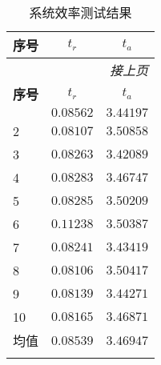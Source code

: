 
\begin{center}
  \setlength{\tabcolsep}{25pt}
  \begin{longtable}{ l c c }
    \hline
    \textbf{序号} & \textbf{$t_r$} & \textbf{$t_a$} \\ \hline \hline
    \endfirsthead
    \multicolumn{3}{r}{\textit{接上页}} \\
    \hline
    \textbf{序号} & \textbf{$t_r$} & \textbf{$t_a$} \\ \hline \hline
    \endhead
    \hline
    \endfoot
    \endlastfoot
    1 & $0.08562$ & $3.44197$ \\
    2 & $0.08107$ & $3.50858$ \\
    3 & $0.08263$ & $3.42089$ \\
    4 & $0.08283$ & $3.46747$ \\
    5 & $0.08285$ & $3.50209$ \\
    6 & $0.11238$ & $3.50387$ \\
    7 & $0.08241$ & $3.43419$ \\
    8 & $0.08106$ & $3.50417$ \\
    9 & $0.08139$ & $3.44271$ \\
    10 & $0.08165$ & $3.46871$ \\
    均值 & $0.08539$ & $3.46947$ \\
    \hline
  \caption{系统效率测试结果} \\
  \end{longtable}

  \label{tab:sys-retrieval-effi}
\end{center}

